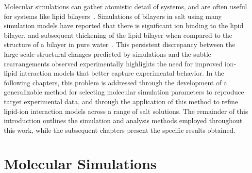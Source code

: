 Molecular simulations can gather atomistic detail of systems, and are often useful for systems like lipid bilayers~\cite{berkowitz:2019}. Simulations of bilayers
in salt using many simulation models 
have reported that there is significant ion binding to the lipid bilayer, and subsequent 
thickening of the lipid bilayer when compared to the structure 
of a bilayer in pure 
water~\cite{Bockmann:2003,cordomi:2008,gurtovenko:2008,Cordomi:2009,jurkiewicz:2012,pandit:2008:simulationtextbook,kruczek:2017,kruczek:2019,saunders:2019}.
This persistent discrepancy between the large-scale structural changes predicted by 
simulations and the subtle rearrangements observed experimentally highlights the need for improved 
ion-lipid interaction models that better capture experimental behavior. 
In the following chapters, this problem is addressed through the development of a generalizable 
method for selecting molecular simulation parameters to reproduce target experimental data, and through 
the application of this method to refine lipid-ion interaction models across a range of salt solutions. 
The remainder of this introduction outlines the simulation and analysis methods employed throughout this work, 
while the subsequent chapters present the specific results obtained.


\section{Molecular Simulations}
